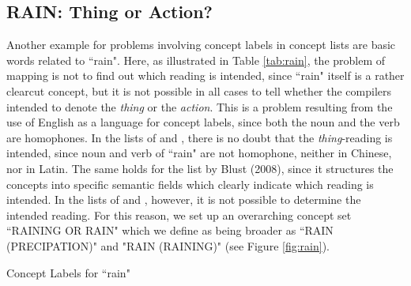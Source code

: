 \documentclass[10pt, a4paper]{article}
\begin{document}
\subsection{RAIN: Thing or Action?}
\noindent Another example for problems involving concept labels in concept lists are basic words related to
``rain". Here, as illustrated in Table \ref{tab:rain}, the problem of mapping is not to find out which reading is intended, since ``rain"
itself is a rather clearcut concept, but it is not possible in all cases to tell whether the
compilers intended to denote the \emph{thing} or the \emph{action}. This is a problem resulting from
the use of English as a language for concept labels, since both the noun and the verb are
homophones. In the lists of  and , there is no doubt that the
\emph{thing}-reading is intended, since noun and verb of ``rain" are not homophone, neither in
Chinese, nor in Latin. The same holds for the list by Blust (2008), since it structures the concepts
into specific semantic fields which clearly indicate which reading is intended. In the lists of
 and , however, it is not possible to determine the
intended reading. For this reason, we set up an overarching concept set ``RAINING OR RAIN" which we define as
being broader as ``RAIN (PRECIPATION)" and "RAIN (RAINING)" (see Figure \ref{fig:rain}).

\begin{table}[h]
    \caption{Concept Labels for ``rain"}
    \label{tab:rain}
  \end{table}
\end{document}
